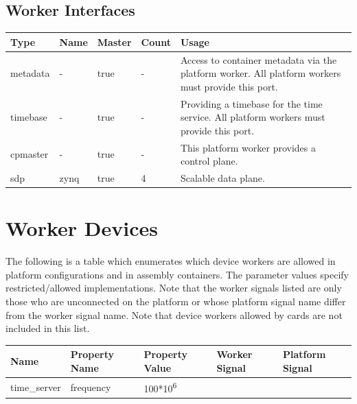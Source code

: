 \documentclass{article}
\begin{document}
\begin{landscape}
	\section*{Worker Interfaces}
	\begin{scriptsize}
		\begin{tabular}{|M{2cm}|M{2cm}|M{1.5cm}|M{1.5cm}|M{14.5cm}|}
			\hline
			Type       & Name & Master & Count & Usage                  \\
			\hline
			metadata   & -    & true   & -     & Access to container metadata via the platform worker. All platform workers must provide this port. \\
			\hline
			timebase   & -    & true   & -     & Providing a timebase for the time service. All platform workers must provide this port. \\
			\hline
			cpmaster   & -    & true   & -     & This platform worker provides a control plane. \\
			\hline
			sdp        & zynq & true   & 4     & Scalable data plane. \\
			\hline
		\end{tabular}
	\end{scriptsize}

\end{landscape}
\pagebreak
	\section*{Worker Devices}
	The following is a table which enumerates which device workers are allowed in platform configurations and in assembly containers. The parameter values specify restricted/allowed implementations. Note that the worker signals listed are only those who are unconnected on the platform or whose platform signal name differ from the worker signal name. Note that device workers allowed by cards are not included in this list.\\
			\begin{tabular}{|M{3cm}|M{3.5cm}|M{3cm}|M{3cm}|M{3cm}|}
			\hline
			Name                       & Property Name    & Property Value              & Worker Signal & Platform Signal         \\
			\hline
			time\_server               & frequency        & 100*10\textsuperscript{6}   &               &                         \\
			\hline
		\end{tabular}
\end{document}

